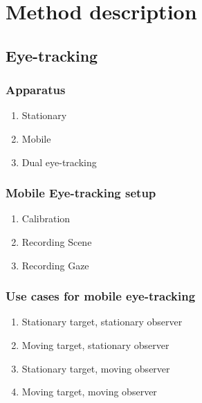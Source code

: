 \documentclass{sig-alternate}
\begin{document}

\section{Method description}

\subsection{Eye-tracking}


\subsubsection{Apparatus}


\begin{enumerate}
\item Stationary
\item Mobile 
\item Dual eye-tracking

\end {enumerate}


\subsubsection{Mobile Eye-tracking setup}

\begin{enumerate}
\item Calibration
\item Recording Scene 
\item Recording Gaze

\end {enumerate}

\subsubsection{Use cases for mobile eye-tracking} 

\begin{enumerate}
\item Stationary target, stationary observer
\item Moving target, stationary observer
\item Stationary target, moving observer
\item Moving target, moving observer
\end{enumerate}
\end{document}
